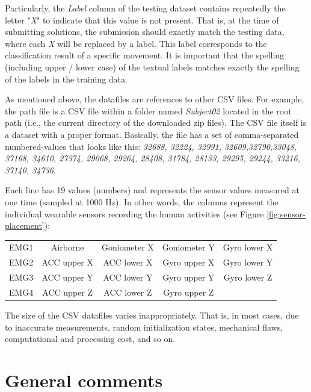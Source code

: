 Particularly, the \emph{Label} column of the testing dataset contains repeatedly the letter "\textit{X}"
to indicate that this value is not present. That is, at the time of submitting solutions, the submission should
exactly match the testing data, where each \emph{X} will be replaced by a label. This label corresponds to the
classification result of a specific movement. It is important that the spelling (including upper / lower
case) of the textual labels matches exactly the spelling of the labels in the training data.

As mentioned above, the datafiles are references to other CSV files. For example, the path file
 is a CSV file within a folder named \emph{Subject02}
located in the root path (i.e., the current directory of the downloaded zip files). The CSV file itself
is a dataset with a proper format. Basically, the file has a set of comma-separated numbered-values
that looks like this: \textit{32688, 32224, 32991, 32609,32790,33048, 37168, 34610, 27374, 29068, 29264,
28408, 31784, 28133, 29295, 29244, 33216, 37140, 34736}.

Each line has 19 values (numbers) and represents the sensor values measured at one time (sampled at
1000 Hz). In other words, the columns represent the individual wearable sensors recording the human
activities (see Figure \ref{fig:sensor-placement}):

\begin{center}
    \begin{tabular}{ c c c c c }
     EMG1 & Airborne    & Goniometer X & Goniometer Y & Gyro lower X \\
     EMG2 & ACC upper X & ACC lower X  & Gyro upper X & Gyro lower Y \\
     EMG3 & ACC upper Y & ACC lower Y  & Gyro upper Y & Gyro lower Z \\
     EMG4 & ACC upper Z & ACC lower Z  & Gyro upper Z &
    \end{tabular}
\end{center}


The size of the CSV datafiles varies inappropriately. That is, in most cases, due to inaccurate measurements,
random initialization states, mechanical flaws, computational and processing cost, and so on.


\section{General comments}

